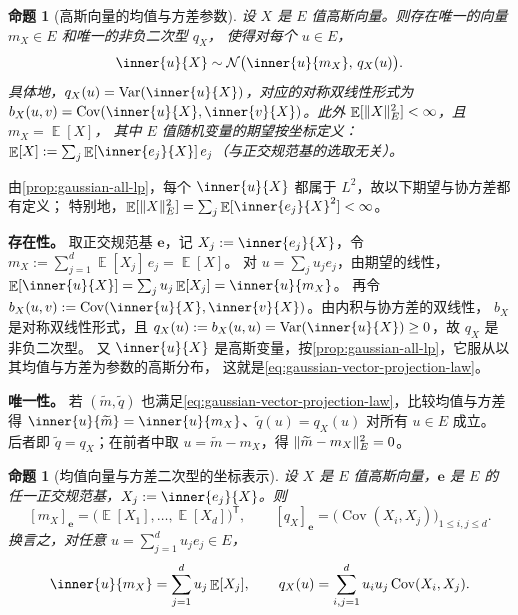 \documentclass[UTF8,11pt,a4paper,oneside,fontset=fandol]{ctexrep}
\makeatletter
\numberwithin{equation}{section}
\theoremstyle{zhthm}
\newtheorem{proposition}[theorem]{命题}
\renewenvironment{proof}[1][\proofname]{\par
  \pushQED{\qed}%
  \normalfont\topsep6\p@\@plus6\p@\relax
  \trivlist
  \item[\hskip\labelsep\bfseries#1\hspace{0.5em}]\ignorespaces
}{%
  \popQED\endtrivlist\@endpefalse
}
\renewcommand{\proofname}{证明}
\DeclareMathOperator{\E}{\mathbb{E}}
\DeclareMathOperator{\Var}{Var}
\DeclareMathOperator{\Cov}{Cov}
\newcommand{\Normal}{\mathcal{N}}
\DeclarePairedDelimiter{\norm}{\lVert}{\rVert}
\makeatother
\begin{document}
\begin{proposition}[高斯向量的均值与方差参数]
\label{prop:gaussian-vector-parameters}
设 $X$ 是 $E$ 值高斯向量。则存在唯一的向量 $m_X\in E$ 和唯一的非负二次型 $q_X$，
使得对每个 $u\in E$，
\begin{equation}
  \label{eq:gaussian-vector-projection-law}
  \inner{u}{X}\sim\Normal\bigl(\inner{u}{m_X},\,q_X(u)\bigr).
\end{equation}
具体地，$q_X(u)=\Var(\inner{u}{X})$，对应的对称双线性形式为
$b_X(u,v)=\Cov(\inner{u}{X},\inner{v}{X})$。此外 $\E[\norm{X}_E^2]<\infty$，且 $m_X=\E[X]$，
其中 $E$ 值随机变量的期望按坐标定义：$\E[X]:=\sum_{j}\E[\inner{e_j}{X}]\,e_j$（与正交规范基的选取无关）。
\end{proposition}

\begin{proof}
由\cref{prop:gaussian-all-lp}，每个 $\inner{u}{X}$ 都属于 $L^2$，故以下期望与协方差都有定义；
特别地，$\E[\norm{X}_E^2]=\sum_{j}\E[\inner{e_j}{X}^2]<\infty$。

\textbf{存在性。}
取正交规范基 $\mathbf e$，记 $X_j:=\inner{e_j}{X}$，令 $m_X:=\sum_{j=1}^{d}\E[X_j]\,e_j=\E[X]$。
对 $u=\sum_ju_je_j$，由期望的线性，$\E[\inner{u}{X}]=\sum_ju_j\E[X_j]=\inner{u}{m_X}$。
再令 $b_X(u,v):=\Cov(\inner{u}{X},\inner{v}{X})$。由内积与协方差的双线性，
$b_X$ 是对称双线性形式，且 $q_X(u):=b_X(u,u)=\Var(\inner{u}{X})\ge0$，故 $q_X$ 是非负二次型。
又 $\inner{u}{X}$ 是高斯变量，按\cref{prop:gaussian-all-lp}，它服从以其均值与方差为参数的高斯分布，
这就是\cref{eq:gaussian-vector-projection-law}。

\textbf{唯一性。}
若 $(\widetilde m,\widetilde q)$ 也满足\cref{eq:gaussian-vector-projection-law}，比较均值与方差得
$\inner{u}{\widetilde m}=\inner{u}{m_X}$、$\widetilde q(u)=q_X(u)$ 对所有 $u\in E$ 成立。
后者即 $\widetilde q=q_X$；在前者中取 $u=\widetilde m-m_X$，得 $\norm{\widetilde m-m_X}_E^2=0$。
\end{proof}

\begin{proposition}[均值向量与方差二次型的坐标表示]
\label{prop:gaussian-vector-covariance-coordinates}
设 $X$ 是 $E$ 值高斯向量，$\mathbf e$ 是 $E$ 的任一正交规范基，$X_j:=\inner{e_j}{X}$。则
\[
  [m_X]_{\mathbf e}=\bigl(\E[X_1],\ldots,\E[X_d]\bigr)^{\mathsf T},
  \qquad
  [q_X]_{\mathbf e}=\bigl(\Cov(X_i,X_j)\bigr)_{1\le i,j\le d}.
\]
换言之，对任意 $u=\sum_{j=1}^{d}u_je_j\in E$，
\begin{equation}
  \label{eq:gaussian-vector-covariance-form}
  \inner{u}{m_X}=\sum_{j=1}^{d}u_j\E[X_j],\qquad
  q_X(u)=\sum_{i,j=1}^{d}u_iu_j\Cov(X_i,X_j).
\end{equation}
\end{proposition}
\end{document}
